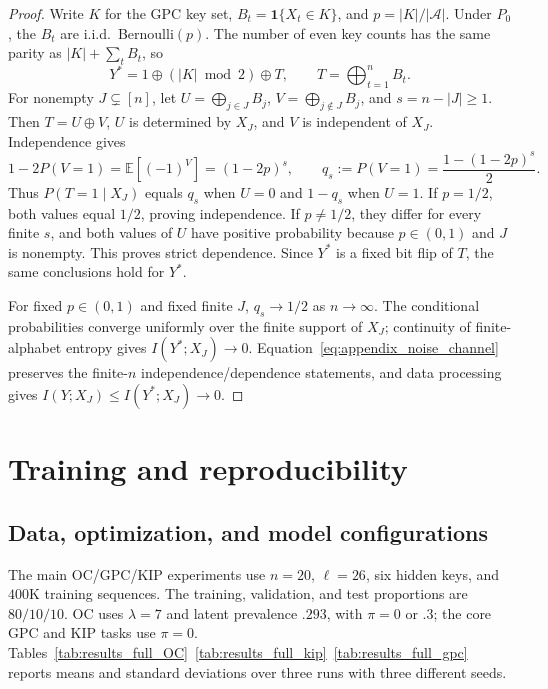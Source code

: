 \documentclass{article} %
\theoremstyle{plain}
\theoremstyle{definition}
\theoremstyle{remark}
\begin{document}
\begin{proof}
Write $K$ for the GPC key set, $B_t=\mathbf1\{X_t\in K\}$, and
$p=|K|/|\mathcal A|$. Under $P_0$, the $B_t$ are i.i.d.\ Bernoulli$(p)$.
The number of even key counts has the same parity as
$|K|+\sum_t B_t$, so
\[
Y^*=1\oplus(|K|\bmod2)\oplus T,\qquad T=\bigoplus_{t=1}^n B_t.
\]
For nonempty $J\subsetneq[n]$, let $U=\bigoplus_{j\in J}B_j$,
$V=\bigoplus_{j\notin J}B_j$, and $s=n-|J|\geq1$.
Then $T=U\oplus V$, $U$ is determined by $X_J$, and $V$ is independent
of $X_J$. Independence gives
\[
1-2P(V=1)=\mathbb E[(-1)^V]=(1-2p)^s,
\qquad q_s:=P(V=1)=\frac{1-(1-2p)^s}{2}.
\]
Thus $P(T=1\mid X_J)$ equals $q_s$ when $U=0$ and $1-q_s$ when $U=1$.
If $p=1/2$, both values equal $1/2$, proving independence. If $p\ne1/2$,
they differ for every finite $s$, and both values of $U$ have positive
probability because $p\in(0,1)$ and $J$ is nonempty. This proves strict
dependence. Since $Y^*$ is a fixed bit flip of $T$, the same conclusions
hold for $Y^*$.

For fixed $p\in(0,1)$ and fixed finite $J$, $q_s\to1/2$ as $n\to\infty$.
The conditional probabilities converge uniformly over the finite support
of $X_J$; continuity of finite-alphabet entropy gives $I(Y^*;X_J)\to0$.
Equation~\eqref{eq:appendix_noise_channel} preserves the finite-$n$
independence/dependence statements, and data processing gives
$I(Y;X_J)\leq I(Y^*;X_J)\to0$.
\end{proof}

\section{Training and reproducibility}
\label{appendix:training}

\subsection{Data, optimization, and model configurations}
\label{subsec:training_appendix}
\label{appendix:fractions}

The main OC/GPC/KIP experiments use $n=20$, $\ell=26$, six hidden keys, and
$400$K training sequences. The training, validation, and test proportions
are $80/10/10$. OC uses $\lambda=7$ and latent prevalence $.293$, with
$\pi=0$ or $.3$; the core GPC and KIP tasks use $\pi=0$.
Tables~\ref{tab:results_full_OC}~\ref{tab:results_full_kip}~\ref{tab:results_full_gpc}
reports means and standard deviations over three runs with three different seeds.
\end{document}
